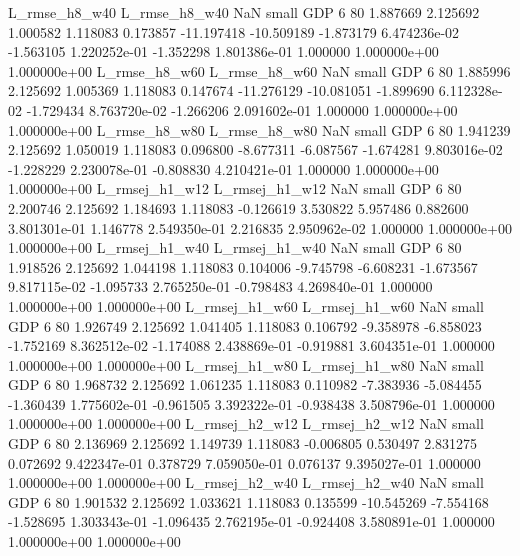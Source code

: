  L_rmse_h8_w40  L_rmse_h8_w40                   NaN      small      GDP                 6 80 1.887669       2.125692 1.000582       1.118083    0.173857    -11.197418    -10.509189    -1.873179   6.474236e-02 -1.563105 1.220252e-01    -1.352298   1.801386e-01            1.000000    1.000000e+00        1.000000e+00
 L_rmse_h8_w60  L_rmse_h8_w60                   NaN      small      GDP                 6 80 1.885996       2.125692 1.005369       1.118083    0.147674    -11.276129    -10.081051    -1.899690   6.112328e-02 -1.729434 8.763720e-02    -1.266206   2.091602e-01            1.000000    1.000000e+00        1.000000e+00
 L_rmse_h8_w80  L_rmse_h8_w80                   NaN      small      GDP                 6 80 1.941239       2.125692 1.050019       1.118083    0.096800     -8.677311     -6.087567    -1.674281   9.803016e-02 -1.228229 2.230078e-01    -0.808830   4.210421e-01            1.000000    1.000000e+00        1.000000e+00
L_rmsej_h1_w12 L_rmsej_h1_w12                   NaN      small      GDP                 6 80 2.200746       2.125692 1.184693       1.118083   -0.126619      3.530822      5.957486     0.882600   3.801301e-01  1.146778 2.549350e-01     2.216835   2.950962e-02            1.000000    1.000000e+00        1.000000e+00
L_rmsej_h1_w40 L_rmsej_h1_w40                   NaN      small      GDP                 6 80 1.918526       2.125692 1.044198       1.118083    0.104006     -9.745798     -6.608231    -1.673567   9.817115e-02 -1.095733 2.765250e-01    -0.798483   4.269840e-01            1.000000    1.000000e+00        1.000000e+00
L_rmsej_h1_w60 L_rmsej_h1_w60                   NaN      small      GDP                 6 80 1.926749       2.125692 1.041405       1.118083    0.106792     -9.358978     -6.858023    -1.752169   8.362512e-02 -1.174088 2.438869e-01    -0.919881   3.604351e-01            1.000000    1.000000e+00        1.000000e+00
L_rmsej_h1_w80 L_rmsej_h1_w80                   NaN      small      GDP                 6 80 1.968732       2.125692 1.061235       1.118083    0.110982     -7.383936     -5.084455    -1.360439   1.775602e-01 -0.961505 3.392322e-01    -0.938438   3.508796e-01            1.000000    1.000000e+00        1.000000e+00
L_rmsej_h2_w12 L_rmsej_h2_w12                   NaN      small      GDP                 6 80 2.136969       2.125692 1.149739       1.118083   -0.006805      0.530497      2.831275     0.072692   9.422347e-01  0.378729 7.059050e-01     0.076137   9.395027e-01            1.000000    1.000000e+00        1.000000e+00
L_rmsej_h2_w40 L_rmsej_h2_w40                   NaN      small      GDP                 6 80 1.901532       2.125692 1.033621       1.118083    0.135599    -10.545269     -7.554168    -1.528695   1.303343e-01 -1.096435 2.762195e-01    -0.924408   3.580891e-01            1.000000    1.000000e+00        1.000000e+00
